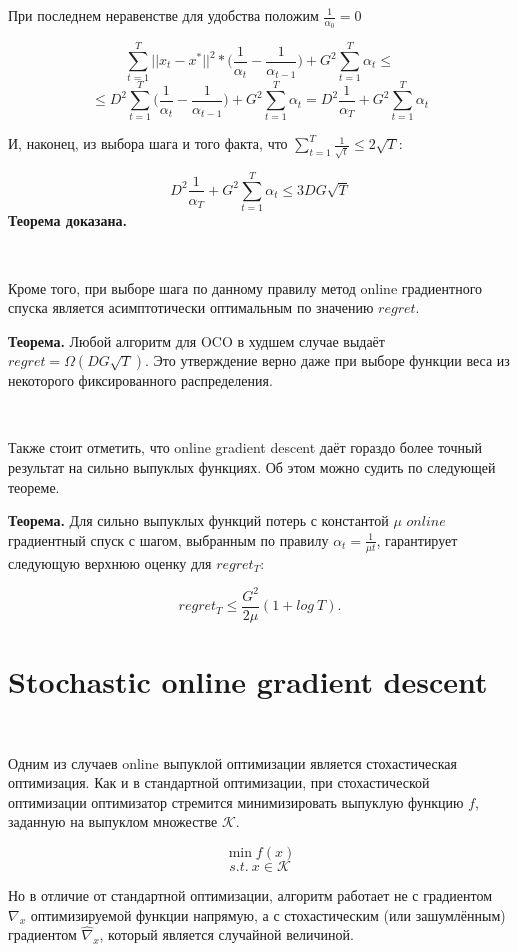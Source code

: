 \documentclass[12pt]{article}
\begin{document}
При последнем неравенстве для удобства положим $\frac{1}{\alpha_0} = 0$

$$\sum\limits_{t=1}^T 
||x_t-x^*||^2*\bigg(\frac{1}{\alpha_t}-\frac{1}{\alpha_{t-1}}\bigg) + G^2 \sum\limits_{t=1}^T \alpha_t \leq $$
$$\leq D^2\sum\limits_{t=1}^T \bigg(\frac{1}{\alpha_t}-\frac{1}{\alpha_{t-1}}\bigg) + G^2 \sum\limits_{t=1}^T \alpha_t = D^2 \frac{1}{\alpha_T} + G^2 \sum\limits_{t=1}^T \alpha_t$$

И, наконец, из выбора шага и того факта, что $\sum\limits_{t=1}^T \frac{1}{\sqrt{t}} \leq 2\sqrt{T}$:

$$D^2 \frac{1}{\alpha_T} + G^2 \sum\limits_{t=1}^T \alpha_t \leq 3DG\sqrt{T}$$
\textbf{Теорема доказана.}

$ $

Кроме того, при выборе шага по данному правилу метод online градиентного спуска является асимптотически оптимальным по значению $regret$.

\textbf{Теорема.} Любой алгоритм для OCO в худшем случае выдаёт $regret = \Omega(DG\sqrt{T})$. Это утверждение верно даже при выборе функции веса из некоторого фиксированного распределения.

$ $

Также стоит отметить, что online gradient descent даёт гораздо более точный результат на сильно выпуклых функциях. Об этом можно судить по следующей теореме.
$ $

\textbf{Теорема.} Для сильно выпуклых функций потерь с константой $\mu$ $online$ градиентный спуск с шагом, выбранным по правилу $\alpha_t = \frac{1}{\mu t}$, гарантирует следующую верхнюю оценку для $regret_T$:

$$regret_{T} \leq \frac{G^2}{2\mu}(1 + log\ T).$$

\section*{Stochastic online gradient descent}
$ $

Одним из случаев online выпуклой оптимизации является стохастическая оптимизация. Как и в стандартной оптимизации, при стохастической оптимизации оптимизатор стремится минимизировать выпуклую функцию $f$, заданную на выпуклом множестве $\mathcal{K}$.

$$\min f(x)$$
$$s.t.\ x \in \mathcal{K}$$

Но в отличие от стандартной оптимизации, алгоритм работает не с градиентом $\nabla_x$ оптимизируемой функции напрямую, а с стохастическим (или зашумлённым) градиентом $\widehat{\nabla}_x$, который является случайной величиной.
\end{document}
